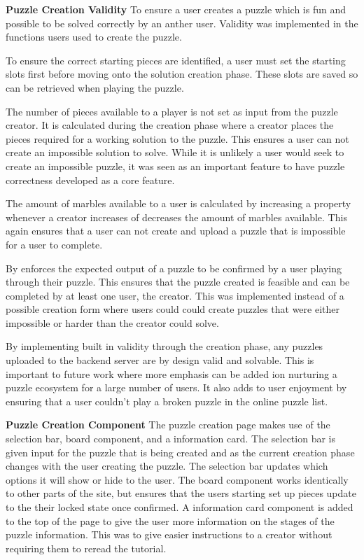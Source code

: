 \documentclass{l4proj}
\begin{document}
\textbf{Puzzle Creation Validity}
To ensure a user creates a puzzle which is fun and possible to be solved correctly by an anther user. Validity was implemented in the functions users used to create the puzzle.

To ensure the correct starting pieces are identified, a user must set the starting slots first before moving onto the solution creation phase. These slots are saved so can be retrieved when playing the puzzle.

The number of pieces available to a player is not set as input from the puzzle creator. It is calculated during the creation phase where a creator places the pieces required for a working solution to the puzzle. This ensures a user can not create an impossible solution to solve. While it is unlikely a user would seek to create an impossible puzzle, it was seen as an important feature to have puzzle correctness developed as a core feature. 

The amount of marbles available to a user is calculated by increasing a property whenever a creator increases of decreases the amount of marbles available. This again ensures that a user can not create and upload a puzzle that is impossible for a user to complete. 

By enforces the expected output of a puzzle to be confirmed by a user playing through their puzzle. This ensures that the puzzle created is feasible and can be completed by at least one user, the creator. This was implemented instead of a possible creation form where users could could create puzzles that were either impossible or harder than the creator could solve.

By implementing built in validity through the creation phase, any puzzles uploaded to the backend server are by design valid and solvable. This is important to future work where more emphasis can be added ion nurturing a puzzle ecosystem for a large number of users. It also adds to user enjoyment by ensuring that a user couldn't play a broken puzzle in the online puzzle list.

\textbf{Puzzle Creation Component}
The puzzle creation page makes use of the selection bar, board component, and a information card. The selection bar is given input for the puzzle that is being created and as the current creation phase changes with the user creating the puzzle. The selection bar updates which options it will show or hide to the user. The board component works identically to other parts of the site, but ensures that the users starting set up pieces update to the their locked state once confirmed. A information card component is added to the top of the page to give the user more information on the stages of the puzzle information. This was to give easier instructions to a creator without requiring them to reread the tutorial. 
\end{document}
